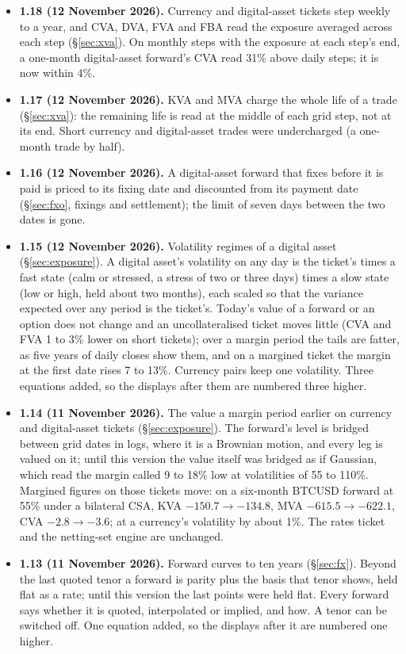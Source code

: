 \documentclass[11pt,a4paper]{article}
\begin{document}
{\begin{itemize}[leftmargin=1.4em, itemsep=4pt]
\item \textbf{1.18 (12 November 2026).} Currency and digital-asset tickets step weekly to a year, and CVA, DVA, FVA and FBA read the exposure averaged across each step (\S\ref{sec:xva}). On monthly steps with the exposure at each step's end, a one-month digital-asset forward's CVA read 31\% above daily steps; it is now within 4\%.
\item \textbf{1.17 (12 November 2026).} KVA and MVA charge the whole life of a trade (\S\ref{sec:xva}): the remaining life is read at the middle of each grid step, not at its end. Short currency and digital-asset trades were undercharged (a one-month trade by half).
\item \textbf{1.16 (12 November 2026).} A digital-asset forward that fixes before it is paid is priced to its fixing date and discounted from its payment date (\S\ref{sec:fxo}, fixings and settlement); the limit of seven days between the two dates is gone.
\item \textbf{1.15 (12 November 2026).} Volatility regimes of a digital asset (\S\ref{sec:exposure}). A digital asset's volatility on any day is the ticket's times a fast state (calm or stressed, a stress of two or three days) times a slow state (low or high, held about two months), each scaled so that the variance expected over any period is the ticket's. Today's value of a forward or an option does not change and an uncollateralised ticket moves little (CVA and FVA 1 to 3\% lower on short tickets); over a margin period the tails are fatter, as five years of daily closes show them, and on a margined ticket the margin at the first date rises 7 to 13\%. Currency pairs keep one volatility. Three equations added, so the displays after them are numbered three higher.
\item \textbf{1.14 (11 November 2026).} The value a margin period earlier on currency and digital-asset tickets (\S\ref{sec:exposure}). The forward's level is bridged between grid dates in logs, where it is a Brownian motion, and every leg is valued on it; until this version the value itself was bridged as if Gaussian, which read the margin called 9 to 18\% low at volatilities of 55 to 110\%. Margined figures on those tickets move: on a six-month BTCUSD forward at 55\% under a bilateral CSA, KVA $-150.7\to-134.8$, MVA $-615.5\to-622.1$, CVA $-2.8\to-3.6$; at a currency's volatility by about 1\%. The rates ticket and the netting-set engine are unchanged.
\item \textbf{1.13 (11 November 2026).} Forward curves to ten years (\S\ref{sec:fx}). Beyond the last quoted tenor a forward is parity plus the basis that tenor shows, held flat as a rate; until this version the last points were held flat. Every forward says whether it is quoted, interpolated or implied, and how. A tenor can be switched off. One equation added, so the displays after it are numbered one higher.

\end{itemize}}
\end{document}
